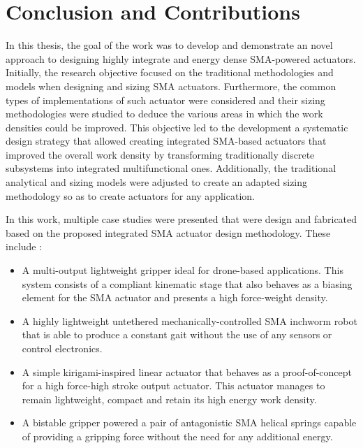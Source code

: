 
\chapter*{Conclusion and Contributions}

In this thesis, the goal of the work was to develop and demonstrate an novel approach to designing highly integrate and energy dense SMA-powered actuators. Initially, the research objective focused on the traditional methodologies and models when designing and sizing SMA actuators. Furthermore, the common types of implementations of such actuator were considered and their sizing methodologies were studied to deduce the various areas in which the work densities could be improved. This objective led to the development a systematic design strategy that allowed creating integrated SMA-based actuators that improved the overall work density by transforming traditionally discrete subsystems into integrated multifunctional ones. Additionally, the traditional analytical and sizing models were adjusted to create an adapted sizing methodology so as to create actuators for any application.

In this work, multiple case studies were presented that were design and fabricated based on the proposed integrated SMA actuator design methodology. These include :

\begin{itemize}
    \item A multi-output lightweight gripper ideal for drone-based applications. This system consists of a compliant kinematic stage that also behaves as a biasing element for the SMA actuator and presents a high force-weight density.
    \item A highly lightweight untethered mechanically-controlled SMA inchworm robot that is able to produce a constant gait without the use of any sensors or control electronics.
    \item A simple kirigami-inspired linear actuator that behaves as a proof-of-concept for a high force-high stroke output actuator. This actuator manages to remain lightweight, compact and retain its high energy work density.
    \item A bistable gripper powered a pair of antagonistic SMA helical springs capable of providing a gripping force without the need for any additional energy.
\end{itemize}

